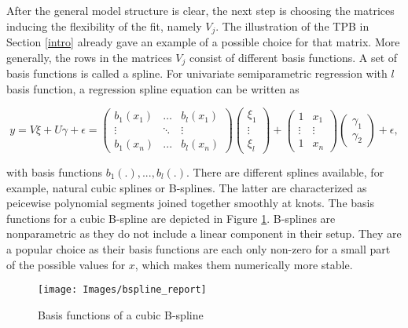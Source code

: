 \documentclass[12pt]{article}
\begin{document}
After the general model structure is clear, the next step is choosing the matrices inducing the flexibility of the fit, namely $V_j$.
The illustration of the TPB in Section \ref{intro} already gave an example of a possible choice for that matrix. More generally, the rows in the matrices $V_j$ consist of different basis functions. A set of basis functions is called a spline. For univariate semiparametric regression with $l$ basis function, a regression spline equation can be written as   

$$y = V\xi + U\gamma +\epsilon
= \begin{pmatrix}
b_1(x_1) & \dots & b_l(x_1) \\
 \vdots  & \ddots & \vdots \\
b_1(x_n) & ... & b_l(x_n)
\end{pmatrix} 
\begin{pmatrix}
\xi_1 \\
 \vdots   \\
\xi_l 
\end{pmatrix} 
+ 
\begin{pmatrix}
1 &  x_1 \\
 \vdots & \vdots \\
1 & x_n
\end{pmatrix} 
\begin{pmatrix}
\gamma_1 \\
\gamma_2 
\end{pmatrix} +\epsilon,
$$



with basis functions $b_1(.), ..., b_l(.)$. There are different splines available, for example, natural cubic splines or B-splines. The latter are characterized as peicewise polynomial segments joined together smoothly at knots. The basis functions for a cubic B-spline are depicted in Figure \ref{bsplines}. B-splines are nonparametric as they do not include a linear component in their setup. They are a popular choice as their basis functions are each only non-zero for a small part of the possible values for $x$, which makes them numerically more stable.

\begin{figure}[t]
\begin{center}
\vspace{2em}
\texttt{[image: Images/bspline\_report]}
\end{center}
\vspace{-2em}
\caption[caption]{Basis functions of a cubic B-spline}\label{bsplines}
\vspace{1em}
\end{figure}
\end{document}
